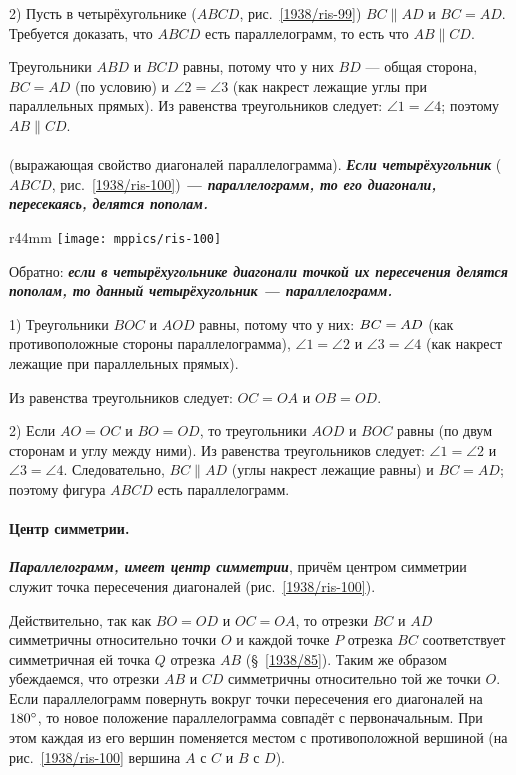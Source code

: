 2) Пусть в четырёхугольнике ($ABCD$, рис.~\ref{1938/ris-99}) $BC\parallel AD$ и $BC = AD$.
Требуется доказать, что $ABCD$ есть параллелограмм, то есть что $AB \parallel CD$.

Треугольники $ABD$ и $BCD$ равны, потому что у них $BD$ — общая сторона, $BC = AD$ (по условию) и $\angle 2 = \angle 3$ (как накрест лежащие углы при параллельных прямых).
Из равенства треугольников следует:
$\angle 1 = \angle 4$;
поэтому $AB\parallel CD$.

\paragraph{}\label{1938/90}
 (выражающая свойство диагоналей параллелограмма).
\textbf{\emph{Если четырёхугольник}} ($ABCD$, рис.~\ref{1938/ris-100}) \textbf{\emph{— параллелограмм, то его диагонали, пересекаясь, делятся пополам.}}

{

\begin{wrapfigure}[9]{r}{44mm}
\vskip-4mm
\centering
\texttt{[image: mppics/ris-100]}
\caption{}\label{1938/ris-100}
\end{wrapfigure}

Обратно:
\textbf{\emph{если в четырёхугольнике диагонали точкой их пересечения делятся пополам, то данный четырёхугольник — параллелограмм.}}

1) Треугольники $BOC$ и $AOD$ равны, потому что у них:
$BC\z=AD$ (как противоположные стороны параллелограмма), $\angle 1 = \angle 2$ и $\angle 3 = \angle 4$ (как накрест лежащие при параллельных прямых).

Из равенства треугольников следует:
$OC=OA$ и $OB=OD$.


2) Если $AO=OC$ и $BO=OD$, то треугольники $AOD$ и $BOC$ равны (по двум сторонам и углу между ними).
Из равенства треугольников следует:
$\angle 1 = \angle 2$ и $\angle 3 = \angle 4$.
Следовательно, $BC \parallel AD$ (углы накрест лежащие равны) и $BC=AD$;
поэтому фигура $ABCD$ есть параллелограмм.

}

\paragraph{Центр симметрии.}\label{1938/91}
\textbf{\emph{Параллелограмм, имеет центр симметрии}}, причём центром симметрии служит точка пересечения диагоналей (рис.~\ref{1938/ris-100}).

Действительно, так как $BO=OD$ и $OC=OA$, то отрезки $BC$ и $AD$ симметричны относительно точки $O$ и каждой точке $P$ отрезка $BC$ соответствует симметричная ей точка $Q$ отрезка $AB$ (§~\ref{1938/85}).
Таким же образом убеждаемся, что отрезки $AB$ и $CD$ симметричны относительно той же точки $O$.
Если параллелограмм повернуть вокруг точки пересечения его диагоналей на $180\degree$, то новое положение параллелограмма совпадёт с первоначальным.
При этом каждая из его вершин поменяется местом с противоположной вершиной 
(на рис.~\ref{1938/ris-100} вершина $A$ с $C$ и $B$ с $D$).


